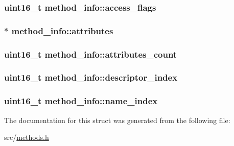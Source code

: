 \subsubsection[{\texorpdfstring{access\+\_\+flags}{access_flags}}]{\setlength{\rightskip}{0pt plus 5cm}uint16\+\_\+t method\+\_\+info\+::access\+\_\+flags}\hypertarget{structmethod__info_a8fc68aba419f2617deda879c467f5410}{}\label{structmethod__info_a8fc68aba419f2617deda879c467f5410}
\subsubsection[{\texorpdfstring{attributes}{attributes}}]{$\ast$ method\+\_\+info\+::attributes}\hypertarget{structmethod__info_a8ce4caaa03680c91f548558a38647ad8}{}\label{structmethod__info_a8ce4caaa03680c91f548558a38647ad8}
\subsubsection[{\texorpdfstring{attributes\+\_\+count}{attributes_count}}]{\setlength{\rightskip}{0pt plus 5cm}uint16\+\_\+t method\+\_\+info\+::attributes\+\_\+count}\hypertarget{structmethod__info_a9e711e4dfb8181f7dce16c6f640ba734}{}\label{structmethod__info_a9e711e4dfb8181f7dce16c6f640ba734}
\subsubsection[{\texorpdfstring{descriptor\+\_\+index}{descriptor_index}}]{\setlength{\rightskip}{0pt plus 5cm}uint16\+\_\+t method\+\_\+info\+::descriptor\+\_\+index}\hypertarget{structmethod__info_abccd6a5202d4c0ee1be6b89692d0352a}{}\label{structmethod__info_abccd6a5202d4c0ee1be6b89692d0352a}
\subsubsection[{\texorpdfstring{name\+\_\+index}{name_index}}]{\setlength{\rightskip}{0pt plus 5cm}uint16\+\_\+t method\+\_\+info\+::name\+\_\+index}\hypertarget{structmethod__info_af0ba3d6d566432e74eed5c37cd998c14}{}\label{structmethod__info_af0ba3d6d566432e74eed5c37cd998c14}


The documentation for this struct was generated from the following file\+:\begin{DoxyCompactItemize}
\item 
src/\hyperlink{methods_8h}{methods.\+h}\end{DoxyCompactItemize}
